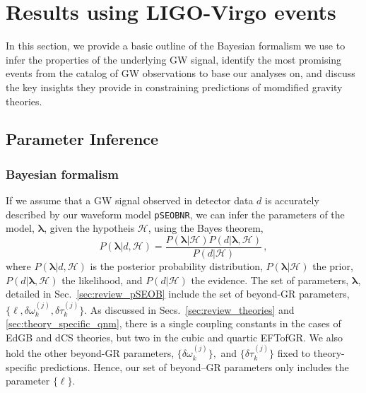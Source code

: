 \documentclass[twocolumn,prd,aps,superscriptaddress,preprintnumbers,tightenlines,showpacs,nofootinbib,eqsecnum,amsfonts,amsmath,longbibliography]{revtex4-1}
\newcommand{\pSEOB}{\texttt{pSEOBNR}}
\newcommand{\hs}[1]{{\textcolor{blue}{{[HS: #1]}} }}
\begin{document}

\section{Results using LIGO-Virgo events}
\label{sec:results}

In this section, we provide a basic outline of the Bayesian formalism we use to infer the properties of the underlying GW signal, identify the most promising events from the catalog of GW observations to base our analyses on, and discuss the key insights they provide in constraining predictions of momdified gravity theories.

\subsection{Parameter Inference}

\subsubsection{Bayesian formalism}
If we assume that a GW signal observed in detector data $d$ is accurately described by our waveform model \pSEOB{}, we can infer the parameters of the model, $\bm{\lambda}$, given the hypotheis $\mathcal{H}$, using the Bayes theorem,
%
\begin{equation}
P(\bm{\lambda} \vert d, \mathcal{H}) =
\frac{P(\bm{\lambda} \vert \mathcal{H}) P(d \vert \bm{\lambda},\mathcal{H})}{P(d \vert \mathcal{H})}\,,
\label{eq:bayes}
\end{equation}
%
where $P(\bm{\lambda} \vert d, \mathcal{H})$ is the posterior probability distribution,
$P(\bm{\lambda} \vert \mathcal{H})$ the prior,
$P(d \vert \bm{\lambda},\mathcal{H})$ the likelihood, and
$P(d \vert \mathcal{H})$ the evidence. The set of parameters, $\bm{\lambda}$, detailed in Sec.~\ref{sec:review_pSEOB}
include the set of beyond-GR parameters, $\{\ell, \delta \omega_k^{(j)}, \delta \tau_k^{(j)}\}$.
%
As discussed in Secs.~\ref{sec:review_theories} and \ref{sec:theory_specific_qnm}, there is a single coupling
constants in the cases of EdGB and dCS theories, but two in the cubic and
quartic EFTofGR. We also hold the other beyond-GR parameters, $\{\delta \omega_k^{(j)}\},$ and $\{\delta \tau_k^{(j)}\}$
fixed to theory-specific predictions. Hence, our set of beyond--GR parameters only includes the parameter $\{\ell \}$.
%
\end{document}
